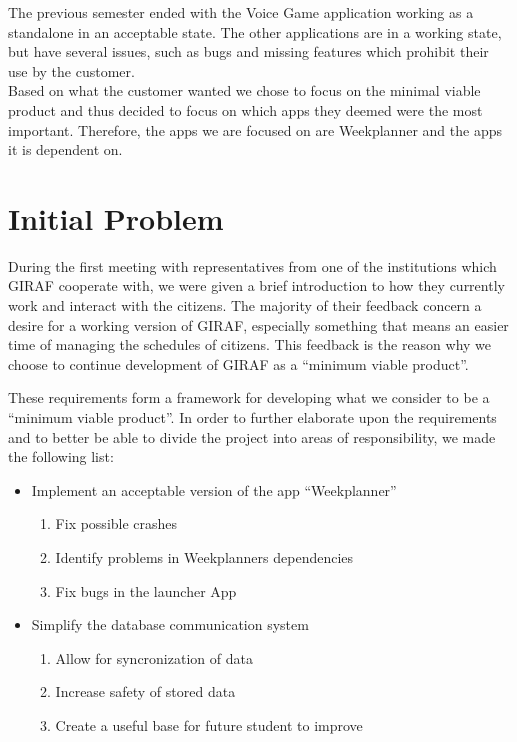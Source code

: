 The previous semester ended with the Voice Game application working as a
standalone in an acceptable state. The other applications are in a working
state, but have several issues, such as bugs and missing features which
prohibit their use by the customer.\\
Based on what the customer wanted we chose to focus on the minimal viable
product and thus decided to focus on which apps they deemed were the most
important. Therefore, the apps we are focused on are Weekplanner and the apps it
is dependent on. 
  
\section{Initial Problem}
During the first meeting with representatives from one of the institutions which
GIRAF cooperate with, we were given a brief introduction to how they currently
work and interact with the citizens. The majority of their feedback concern a
desire for a working version of GIRAF, especially something that means an easier
time of managing the schedules of citizens. This feedback is the reason why we
choose to continue development of GIRAF as a ``minimum viable product''. 



These requirements form a framework for developing what we consider to be a
``minimum viable product''. In order to further elaborate upon the requirements
and to better be able to divide the project into areas of responsibility, we
made the following list:

\begin{itemize}
  \item Implement an acceptable version of the app ``Weekplanner''
  	\begin{enumerate}
  		\item Fix possible crashes
  		\item Identify problems in Weekplanners dependencies
  		\item Fix bugs in the launcher App
	\end{enumerate}
  \item Simplify the database communication system
   	\begin{enumerate}
  		\item Allow for syncronization of data
  		\item Increase safety of stored data
  		\item Create a useful base for future student to improve
	\end{enumerate}
\end{itemize}

